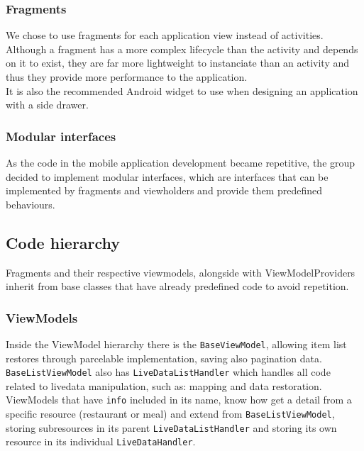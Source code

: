 \subsubsection{Fragments}

We chose to use fragments\cite{fragment} for each application view instead of activities. Although a fragment has a more complex lifecycle than the activity and depends on it
to exist, they are far more lightweight to instanciate than an activity and thus they provide more performance to the application.\\ 

It is also the recommended Android widget to use when designing an application with a side drawer.\\


\subsubsection{Modular interfaces}

As the code in the mobile application development became repetitive, the group decided to implement modular interfaces,
which are interfaces that can be implemented by fragments and viewholders and provide them predefined behaviours.

\subsection{Code hierarchy}

Fragments and their respective viewmodels, alongside with ViewModelProviders inherit from base classes that have already predefined code to avoid repetition.\\

\subsubsection{ViewModels}

Inside the ViewModel hierarchy there is the \texttt{BaseViewModel}, allowing item list restores through parcelable implementation, saving also pagination data.\\

\texttt{BaseListViewModel} also has \texttt{LiveDataListHandler} which handles all code related to livedata manipulation, such as: mapping and data restoration.\\

ViewModels that have \texttt{info} included in its name, know how get a detail from a specific resource (restaurant or meal)
and extend from \texttt{BaseListViewModel},
storing subresources in its parent \texttt{LiveDataListHandler} and storing its own resource in its individual \texttt{LiveDataHandler}.\\

